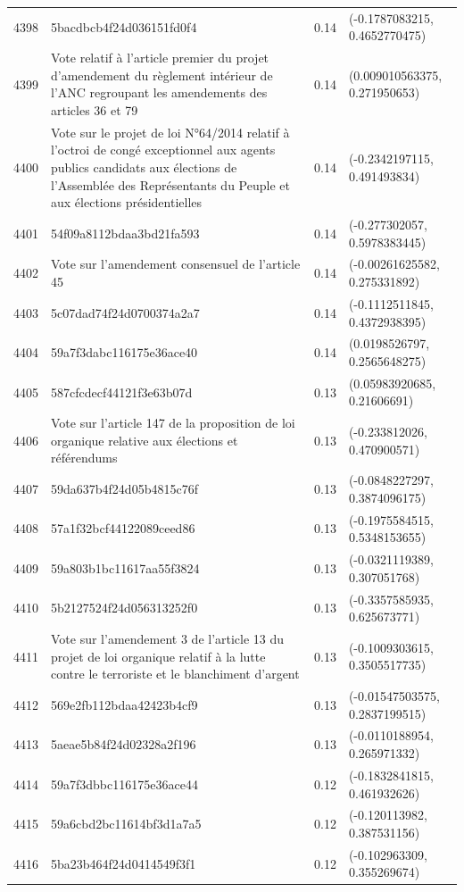 \begin{table}[ht]
\begin{tabular}{rlrl}
  4398 & 5bacdbcb4f24d036151fd0f4 & 0.14 & (-0.1787083215, 0.4652770475) \\ 
  4399 & Vote relatif à l'article premier du projet d'amendement du règlement intérieur de l'ANC regroupant  les amendements des articles 36 et 79 & 0.14 & (0.009010563375, 0.271950653) \\ 
  4400 & Vote sur le projet de loi N°64/2014 relatif à l'octroi de congé exceptionnel aux agents publics candidats aux élections de l'Assemblée des Représentants du Peuple et aux élections présidentielles & 0.14 & (-0.2342197115, 0.491493834) \\ 
  4401 & 54f09a8112bdaa3bd21fa593 & 0.14 & (-0.277302057, 0.5978383445) \\ 
  4402 & Vote sur l'amendement consensuel de l'article 45 & 0.14 & (-0.00261625582, 0.275331892) \\ 
  4403 & 5c07dad74f24d0700374a2a7 & 0.14 & (-0.1112511845, 0.4372938395) \\ 
  4404 & 59a7f3dabc116175e36ace40 & 0.14 & (0.0198526797, 0.2565648275) \\ 
  4405 & 587cfcdecf44121f3e63b07d & 0.13 & (0.05983920685, 0.21606691) \\ 
  4406 & Vote sur l'article 147 de la proposition de loi organique relative aux élections et référendums & 0.13 & (-0.233812026, 0.470900571) \\ 
  4407 & 59da637b4f24d05b4815c76f & 0.13 & (-0.0848227297, 0.3874096175) \\ 
  4408 & 57a1f32bcf44122089ceed86 & 0.13 & (-0.1975584515, 0.5348153655) \\ 
  4409 & 59a803b1bc11617aa55f3824 & 0.13 & (-0.0321119389, 0.307051768) \\ 
  4410 & 5b2127524f24d056313252f0 & 0.13 & (-0.3357585935, 0.625673771) \\ 
  4411 & Vote sur l'amendement 3 de l'article 13 du projet de loi organique relatif à la lutte contre le terroriste et le blanchiment d'argent & 0.13 & (-0.1009303615, 0.3505517735) \\ 
  4412 & 569e2fb112bdaa42423b4cf9 & 0.13 & (-0.01547503575, 0.2837199515) \\ 
  4413 & 5aeae5b84f24d02328a2f196 & 0.13 & (-0.0110188954, 0.265971332) \\ 
  4414 & 59a7f3dbbc116175e36ace44 & 0.12 & (-0.1832841815, 0.461932626) \\ 
  4415 & 59a6cbd2bc11614bf3d1a7a5 & 0.12 & (-0.120113982, 0.387531156) \\ 
  4416 & 5ba23b464f24d0414549f3f1 & 0.12 & (-0.102963309, 0.355269674) \\ 

\end{tabular}
\end{table}
